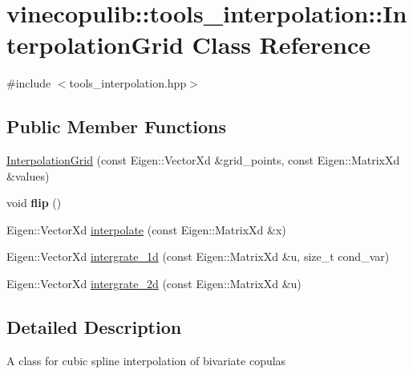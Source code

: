\hypertarget{classvinecopulib_1_1tools__interpolation_1_1_interpolation_grid}{\section{vinecopulib\+:\+:tools\+\_\+interpolation\+:\+:Interpolation\+Grid Class Reference}
\label{classvinecopulib_1_1tools__interpolation_1_1_interpolation_grid}
}


{\ttfamily \#include $<$tools\+\_\+interpolation.\+hpp$>$}

\subsection*{Public Member Functions}
\begin{DoxyCompactItemize}
\item 
\hyperlink{classvinecopulib_1_1tools__interpolation_1_1_interpolation_grid_a2cc351aee4b943dba785881b893b35b2}{Interpolation\+Grid} (const Eigen\+::\+Vector\+Xd \&grid\+\_\+points, const Eigen\+::\+Matrix\+Xd \&values)
\item 
\hypertarget{classvinecopulib_1_1tools__interpolation_1_1_interpolation_grid_a9eec97102cfbb146cda8f6f4d4fc0794}{void {\bfseries flip} ()}\label{classvinecopulib_1_1tools__interpolation_1_1_interpolation_grid_a9eec97102cfbb146cda8f6f4d4fc0794}

\item 
Eigen\+::\+Vector\+Xd \hyperlink{classvinecopulib_1_1tools__interpolation_1_1_interpolation_grid_adee449dd69cee82748f02f9133069fc1}{interpolate} (const Eigen\+::\+Matrix\+Xd \&x)
\item 
Eigen\+::\+Vector\+Xd \hyperlink{classvinecopulib_1_1tools__interpolation_1_1_interpolation_grid_abe7711ab9183964ce99f43dccb097299}{intergrate\+\_\+1d} (const Eigen\+::\+Matrix\+Xd \&u, size\+\_\+t cond\+\_\+var)
\item 
Eigen\+::\+Vector\+Xd \hyperlink{classvinecopulib_1_1tools__interpolation_1_1_interpolation_grid_a2e0e9281bca1d290de2c21871649008b}{intergrate\+\_\+2d} (const Eigen\+::\+Matrix\+Xd \&u)
\end{DoxyCompactItemize}


\subsection{Detailed Description}
A class for cubic spline interpolation of bivariate copulas

